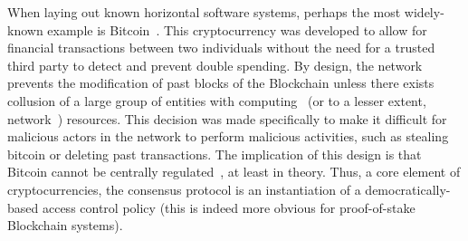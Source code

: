 
When laying out known horizontal software systems, perhaps the most
widely-known example is Bitcoin~\cite{nakamoto2019bitcoin}. This cryptocurrency
was developed to allow for financial transactions between two individuals
without the need for a trusted third party to detect and prevent double
spending. By design, the network prevents the modification of past blocks of
the Blockchain unless there exists collusion of a large group of entities with
computing~\cite{bonneau2018hostile} (or to a lesser extent,
network~\cite{heilman2015eclipse}) resources. This decision was made
specifically to make it difficult for malicious actors in the network to
perform malicious activities, such as stealing bitcoin or deleting past
transactions. The implication of this design is that Bitcoin cannot be
centrally regulated~\cite{tu2015rethinking}, at least in theory. Thus, a core
element of cryptocurrencies, the consensus protocol is an instantiation of a
democratically-based access control policy (this is indeed more obvious for
proof-of-stake Blockchain systems).

